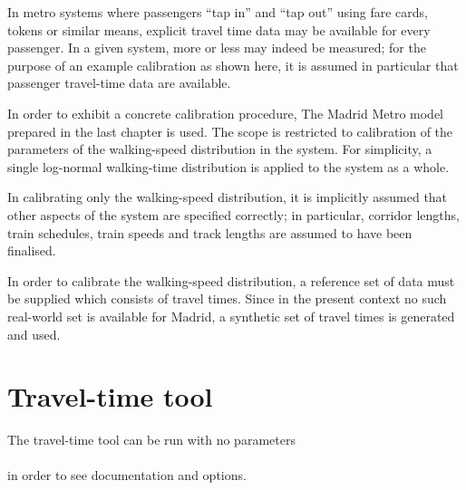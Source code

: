 
In metro systems where passengers ``tap in'' and ``tap out'' using
fare cards, tokens or similar means, explicit travel time data may be
available for every passenger. In a given system, more or less may
indeed be measured; for the purpose of an example calibration as
shown here, it is assumed in particular that passenger travel-time
data are available.

In order to exhibit a concrete calibration procedure, The Madrid Metro
model prepared in the last chapter is used. The scope is restricted to
calibration of the parameters of the walking-speed distribution in the system.
For simplicity, a single log-normal walking-time distribution is applied
to the system as a whole.

In calibrating only the walking-speed distribution, it is implicitly assumed
that other aspects of the system are specified correctly; in particular,
corridor lengths, train schedules, train speeds and track lengths are assumed
to have been finalised.

In order to calibrate the walking-speed distribution, a reference set
of data must be supplied which consists of travel times. Since in the
present context no such real-world set is available for Madrid, a
synthetic set of travel times is generated and used.

\section{Travel-time tool}
The travel-time tool can be run with no parameters\\
\\
in order to see documentation and options.

